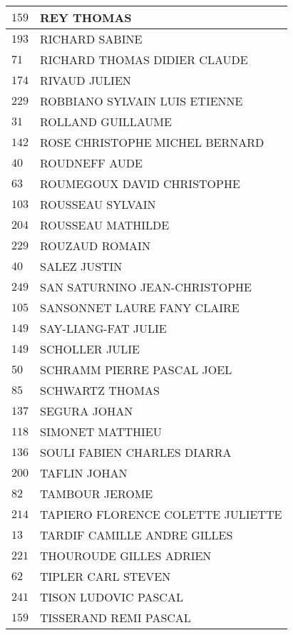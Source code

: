 \begin{xltabular}{\linewidth}{|l|X|}
    \hline
    $159$ & REY THOMAS \\
    \hline
    $193$ & RICHARD SABINE \\
    \hline
    $71$ & RICHARD THOMAS DIDIER CLAUDE \\
    \hline
    $174$ & RIVAUD JULIEN \\
    \hline
    $229$ & ROBBIANO SYLVAIN LUIS ETIENNE \\
    \hline
    $31$ & ROLLAND GUILLAUME \\
    \hline
    $142$ & ROSE CHRISTOPHE MICHEL BERNARD \\
    \hline
    $40$ & ROUDNEFF AUDE \\
    \hline
    $63$ & ROUMEGOUX DAVID CHRISTOPHE \\
    \hline
    $103$ & ROUSSEAU SYLVAIN \\
    \hline
    $204$ & ROUSSEAU MATHILDE \\
    \hline
    $229$ & ROUZAUD ROMAIN \\
    \hline
    $40$ & SALEZ JUSTIN \\
    \hline
    $249$ & SAN SATURNINO JEAN-CHRISTOPHE \\
    \hline
    $105$ & SANSONNET LAURE FANY CLAIRE \\
    \hline
    $149$ & SAY-LIANG-FAT JULIE \\
    \hline
    $149$ & SCHOLLER JULIE \\
    \hline
    $50$ & SCHRAMM PIERRE PASCAL JOEL \\
    \hline
    $85$ & SCHWARTZ THOMAS \\
    \hline
    $137$ & SEGURA JOHAN \\
    \hline
    $118$ & SIMONET MATTHIEU \\
    \hline
    $136$ & SOULI FABIEN CHARLES DIARRA \\
    \hline
    $200$ & TAFLIN JOHAN \\
    \hline
    $82$ & TAMBOUR JEROME \\
    \hline
    $214$ & TAPIERO FLORENCE COLETTE JULIETTE \\
    \hline
    $13$ & TARDIF CAMILLE ANDRE GILLES \\
    \hline
    $221$ & THOUROUDE GILLES ADRIEN \\
    \hline
    $62$ & TIPLER CARL STEVEN \\
    \hline
    $241$ & TISON LUDOVIC PASCAL \\
    \hline
    $159$ & TISSERAND REMI PASCAL \\
    \hline

\end{xltabular}
